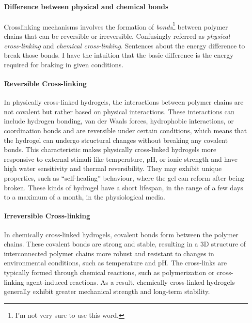 \paragraph{Difference between physical and chemical bonds}
Crosslinking mechanisms involves the formation of \textit{bonds}\footnote{I'm not very sure to use this word.} between polymer chains that can be reversible or irreversible.
Confusingly referred as \textit{physical cross-linking} and \textit{chemical cross-linking}.
Sentences about the energy difference to break those bonds.
I have the intuition that the basic difference is the energy required for braking in given conditions.


\paragraph{Reversible Cross-linking}\citep{priyaComprehensiveReviewHydrogel2024}
In physically cross-linked hydrogels, the interactions between polymer chains are not covalent but rather based on physical interactions. 
These interactions can include hydrogen bonding, van der Waals forces, hydrophobic interactions, or coordination bonds and are reversible under certain conditions, which means that the hydrogel can undergo structural changes without breaking any covalent bonds.
This characteristic makes physically cross-linked hydrogels more responsive to external stimuli like temperature, pH, or ionic strength and have high water sensitivity and thermal reversibility. 
They may exhibit unique properties, such as “self-healing” behaviour, where the gel can reform after being broken.
These kinds of hydrogel have a short lifespan, in the range of a few days to a maximum of a month, in the physiological media. 

\paragraph{Irreversible Cross-linking}\citep{priyaComprehensiveReviewHydrogel2024}
In chemically cross-linked hydrogels, covalent bonds form between the polymer chains.
These covalent bonds are strong and stable, resulting in a 3D structure of interconnected polymer chains more robust and resistant to changes in environmental conditions, such as temperature and pH. 
The cross-links are typically formed through chemical reactions, such as polymerization or cross-linking agent-induced reactions. 
As a result, chemically cross-linked hydrogels generally exhibit greater mechanical strength and long-term stability. 

